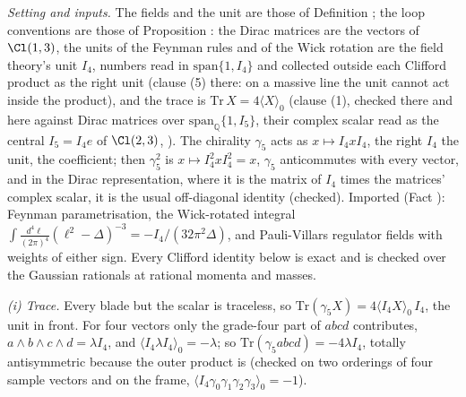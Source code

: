 \emph{Setting and inputs.} The fields and the unit are those of Definition ; the loop conventions are those of Proposition : the Dirac matrices are the vectors of $\Cl(1,3)$, the units of the Feynman rules and of the Wick rotation are the field theory's unit $I_{4}$, numbers read in $\mathrm{span}\{1, I_{4}\}$ and collected outside each Clifford product as the right unit (clause (5) there: on a massive line the unit cannot act inside the product), and the trace is $\mathrm{Tr}\,X = 4\langle X\rangle_{0}$ (clause (1), checked there and here against Dirac matrices over $\mathrm{span}_{\mathbb{Q}}\{1, I_{5}\}$, their complex scalar read as the central $I_{5} = I_{4}e$ of $\Cl(2,3)$, ). The chirality $\gamma_{5}$ acts as $x \mapsto I_{4}xI_{4}$, the right $I_{4}$ the unit, the coefficient; then $\gamma_{5}^{2}$ is $x \mapsto I_{4}^{2}xI_{4}^{2} = x$, $\gamma_{5}$ anticommutes with every vector, and in the Dirac representation, where it is the matrix of $I_{4}$ times the matrices' complex scalar, it is the usual off-diagonal identity (checked). Imported (Fact ): Feynman parametrisation, the Wick-rotated integral $\int\frac{d^{4}\ell}{(2\pi)^{4}}(\ell^{2} - \Delta)^{-3} = -I_{4}/(32\pi^{2}\Delta)$, and Pauli-Villars regulator fields with weights of either sign. Every Clifford identity below is exact and is checked over the Gaussian rationals at rational momenta and masses.

\emph{(i) Trace.} Every blade but the scalar is traceless, so $\mathrm{Tr}(\gamma_{5}X) = 4\langle I_{4}X\rangle_{0}\,I_{4}$, the unit in front. For four vectors only the grade-four part of $abcd$ contributes, $a\wedge b\wedge c\wedge d = \lambda I_{4}$, and $\langle I_{4}\lambda I_{4}\rangle_{0} = -\lambda$; so $\mathrm{Tr}(\gamma_{5}abcd) = -4\lambda I_{4}$, totally antisymmetric because the outer product is (checked on two orderings of four sample vectors and on the frame, $\langle I_{4}\gamma_{0}\gamma_{1}\gamma_{2}\gamma_{3}\rangle_{0} = -1$).

